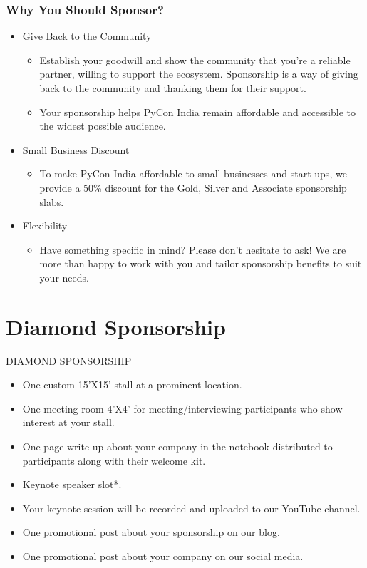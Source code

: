 \documentclass[10pt, compress, aspectratio=169]{beamer}
\begin{document}
\begin{frame}[fragile]
  \frametitle{Why You Should Sponsor?}
      \begin{itemize}
        \item \alert{Give Back to the Community}
          \begin{itemize}
              \item Establish your goodwill and show the community that you’re a reliable partner, willing to support the ecosystem. Sponsorship is a way of giving back to the community and thanking them for their support.
              \item Your sponsorship helps PyCon India remain affordable and accessible to the widest possible audience.
          \end{itemize}
          
          \item \alert{Small Business Discount}
          \begin{itemize}
              \item \small{To make PyCon India affordable to small businesses and start-ups, we provide a 50\% discount for the Gold, Silver and Associate sponsorship slabs.}
          \end{itemize}
          \item \alert{Flexibility}
          \begin{itemize}
              \item Have something specific in mind? Please don’t hesitate to ask! We are more than happy to work with you and tailor sponsorship benefits to suit your needs. 
          \end{itemize}
      \end{itemize}
\end{frame}




\section{Diamond Sponsorship}

\begin{frame}{DIAMOND SPONSORSHIP}
    \begin{itemize}
        \item One custom 15’X15’ stall at a prominent location.
\item One meeting room 4’X4’ for meeting/interviewing participants who show interest at your stall.
\item One page write-up about your company in the notebook distributed to participants along with their welcome kit. 
\item Keynote speaker slot*.
\item Your keynote session will be recorded and uploaded to our YouTube channel.
\item One promotional post about your sponsorship on our blog.
\item One promotional post about your company on our social media.

    \end{itemize}
\end{frame}
\end{document}
